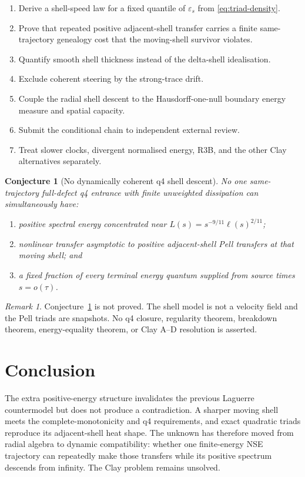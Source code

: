 \documentclass[11pt]{article}
\newtheorem{conjecture}[theorem]{Conjecture}
\theoremstyle{remark}
\newtheorem{remark}[theorem]{Remark}
\begin{document}
\begin{enumerate}
 \item Derive a shell-speed law for a fixed quantile of
 \(\varepsilon_s\) from \eqref{eq:triad-density}.
 \item Prove that repeated positive adjacent-shell transfer carries a
 finite same-trajectory genealogy cost that the moving-shell survivor
 violates.
 \item Quantify smooth shell thickness instead of the delta-shell
 idealisation.
 \item Exclude coherent steering by the strong-trace drift.
 \item Couple the radial shell descent to the Hausdorff-one-null boundary
 energy measure and spatial capacity.
 \item Submit the conditional chain to independent external review.
 \item Treat slower clocks, divergent normalised energy, R3B, and the
 other Clay alternatives separately.
\end{enumerate}

\begin{conjecture}[No dynamically coherent q4 shell descent]
\label{conj:shell}
No one same-trajectory full-defect q4 entrance with finite unweighted
dissipation can simultaneously have:
\begin{enumerate}
 \item positive spectral energy concentrated near
 \(L(s)=s^{-9/11}\ell(s)^{2/11}\);
 \item nonlinear transfer asymptotic to positive adjacent-shell Pell
 transfers at that moving shell; and
 \item a fixed fraction of every terminal energy quantum supplied from
 source times \(s=o(\tau)\).
\end{enumerate}
\end{conjecture}

\begin{remark}
Conjecture~\ref{conj:shell} is not proved.  The shell model is not a
velocity field and the Pell triads are snapshots.  No q4 closure,
regularity theorem, breakdown theorem, energy-equality theorem, or Clay
A--D resolution is asserted.
\end{remark}

\section*{Conclusion}

The extra positive-energy structure invalidates the previous Laguerre
countermodel but does not produce a contradiction.  A sharper moving
shell meets the complete-monotonicity and q4 requirements, and exact
quadratic triads reproduce its adjacent-shell heat shape.  The unknown
has therefore moved from radial algebra to dynamic compatibility:
whether one finite-energy NSE trajectory can repeatedly make those
transfers while its positive spectrum descends from infinity.  The Clay
problem remains unsolved.
\end{document}

